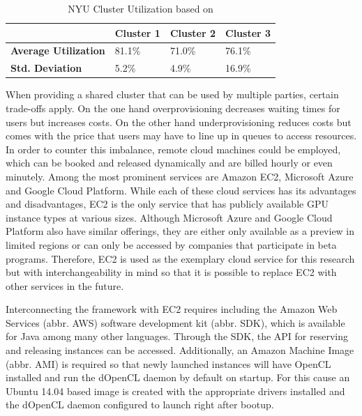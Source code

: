 \begin{table}[!htb]
	\centering
	\begin{adjustbox}{width=0.5\textwidth}
		\small
		\begin{tabular}{l | l | l | l}
			~						& \textbf{Cluster 1}	& \textbf{Cluster 2}	& \textbf{Cluster 3}                 \\
			\hline
			\textbf{Average Utilization} 	& 81.1\%  	& 71.0\% 	& 76.1\% \\
			\textbf{Std. Deviation}          & 5.2\%  	& 4.9\%		& 16.9\% \\
		\end{tabular}
	\end{adjustbox}

	\caption{NYU Cluster Utilization based on \cite{nyu}}
	\label{table:cluster_utilization}
\end{table}

When providing a shared cluster that can be used by multiple parties, certain trade-offs apply. On the one hand overprovisioning decreases waiting times for users but increases costs. On the other hand underprovisioning reduces costs but comes with the price that users may have to line up in queues to access resources. In order to counter this imbalance, remote cloud machines could be employed, which can be booked and released dynamically and are billed hourly or even minutely. Among the most prominent services are Amazon EC2, Microsoft Azure and Google Cloud Platform. While each of these cloud services has its advantages and disadvantages, EC2 is the only service that has publicly available GPU instance types at various sizes. Although Microsoft Azure and Google Cloud Platform also have similar offerings, they are either only available as a preview in limited regions or can only be accessed by companies that participate in beta programs. Therefore, EC2 is used as the exemplary cloud service for this research but with interchangeability in mind so that it is possible to replace EC2 with other services in the future.

Interconnecting the framework with EC2 requires including the Amazon Web Services (abbr. AWS) software development kit (abbr. SDK), which is available for Java among many other languages. Through the SDK, the API for reserving and releasing instances can be accessed. Additionally, an Amazon Machine Image (abbr. AMI) is required so that newly launched instances will have OpenCL installed and run the dOpenCL daemon by default on startup. For this cause an Ubuntu 14.04 based image is created with the appropriate drivers installed and the dOpenCL daemon configured to launch right after bootup.

